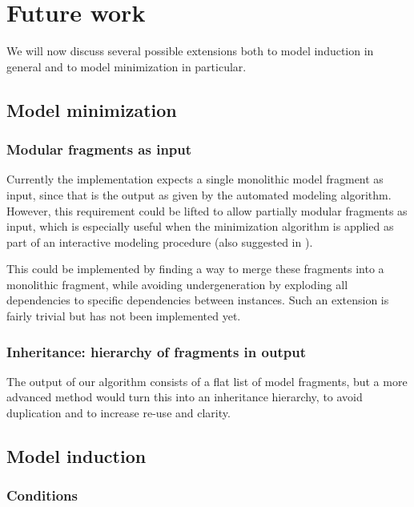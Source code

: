 \documentclass{article} %
\begin{document}


\section{Future work}
\label{sec:discussion}
We will now discuss several possible extensions both to model induction in
general and to model minimization in particular.

\subsection{Model minimization}


\subsubsection{Modular fragments as input}

Currently the implementation expects a single monolithic model fragment as
input, since that is the output as given by the automated modeling algorithm.
However, this requirement could be lifted to allow partially modular fragments
as input, which is especially useful when the minimization algorithm is applied
as part of an interactive modeling procedure (also suggested in \cite{liem}).

This could be implemented by finding a way to merge these fragments into a
monolithic fragment, while avoiding undergeneration by exploding all
dependencies to specific dependencies between instances. Such an extension is
fairly trivial but has not been implemented yet.

\subsubsection{Inheritance: hierarchy of fragments in output}

The output of our algorithm consists of a flat list of model fragments, but a
more advanced method would turn this into an inheritance hierarchy, to avoid
duplication and to increase re-use and clarity.

\subsection{Model induction}

\subsubsection{Conditions}
\end{document}
